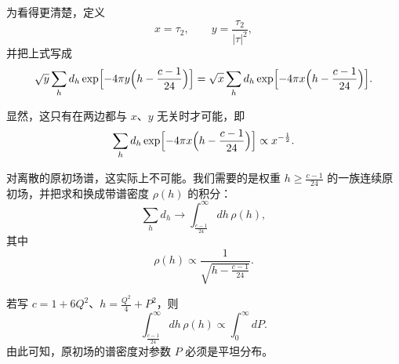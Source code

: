 
为看得更清楚，定义
\begin{equation}\label{eq:3-54}
  x=\tau_2,\qquad y=\frac{\tau_2}{|\tau|^2},
\end{equation}
并把上式写成
\begin{equation}\label{eq:3-55}
  \sqrt{y}\sum_h d_h\exp\Bigl[-4\pi y\Bigl(h-\frac{c-1}{24}\Bigr)\Bigr]
  =\sqrt{x}\sum_h d_h\exp\Bigl[-4\pi x\Bigl(h-\frac{c-1}{24}\Bigr)\Bigr].
\end{equation}


显然，这只有在两边都与 $x$、$y$ 无关时才可能，即
\begin{equation}\label{eq:3-56}
  \sum_h d_h\exp\Bigl[-4\pi x\Bigl(h-\frac{c-1}{24}\Bigr)\Bigr]\propto x^{-\frac12}.
\end{equation}

对离散的原初场谱，这实际上不可能。我们需要的是权重 $h\ge\frac{c-1}{24}$ 的一族连续原初场，并把求和换成带谱密度 $\rho(h)$ 的积分：
\begin{equation}\label{eq:3-57}
  \sum_h d_h\to\int_{\frac{c-1}{24}}^{\infty}dh\,\rho(h),
\end{equation}
其中
\begin{equation}\label{eq:3-58}
  \rho(h)\propto\frac{1}{\sqrt{h-\frac{c-1}{24}}}.
\end{equation}


若写 $c=1+6Q^2$、$h=\frac{Q^2}{4}+P^2$，则
\begin{equation}\label{eq:3-59}
  \int_{\frac{c-1}{24}}^{\infty}dh\,\rho(h)\propto\int_0^{\infty}dP .
\end{equation}
由此可知，原初场的谱密度对参数 $P$ 必须是平坦分布。

